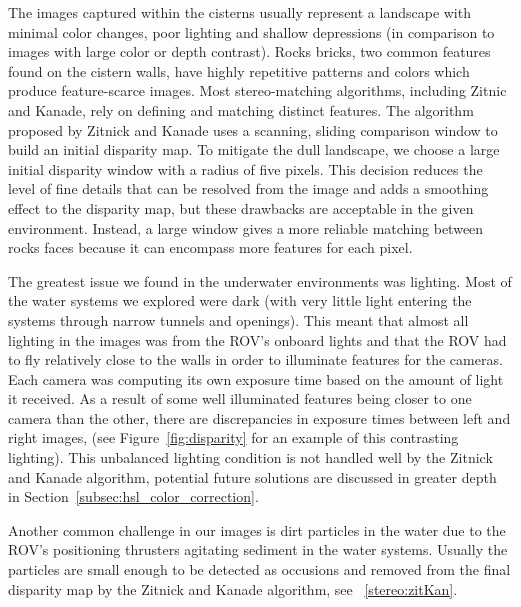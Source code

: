 \documentclass[twocolumn]{article}
\begin{document}
The images captured within the cisterns usually represent a landscape with minimal color changes, poor lighting and shallow depressions (in comparison to images with large color or depth contrast).
Rocks bricks, two common features found on the cistern walls, have highly repetitive patterns and colors which produce feature-scarce images.
Most stereo-matching algorithms, including Zitnic and Kanade, rely on defining and matching distinct features.
The algorithm proposed by Zitnick and Kanade uses a scanning, sliding comparison window to build an initial disparity map.
To mitigate the dull landscape, we choose a large initial disparity window with a radius of five pixels.
This decision reduces the level of fine details that can be resolved from the image and adds a smoothing effect to the disparity map, but these drawbacks are acceptable in the given environment.
Instead, a large window gives a more reliable matching between rocks faces because it can encompass more features for each pixel.  

The greatest issue we found in the underwater environments was lighting.  Most of the water systems we explored were dark (with very little light entering the systems through narrow tunnels and openings).  This meant that almost all lighting in the images was from the ROV's onboard lights and that the ROV had to fly relatively close to the walls in order to illuminate features for the cameras.
Each camera was computing its own exposure time based on the amount of light it received.  
As a result of some well illuminated features being closer to one camera than the other, there are discrepancies in exposure times between left and right images, (see Figure~\ref{fig:disparity} for an example of this contrasting lighting).
  This unbalanced lighting condition is not handled well by the Zitnick and Kanade algorithm, potential future solutions are discussed in greater depth in Section~\ref{subsec:hsl_color_correction}.

Another common challenge in our images is dirt particles in the water due to the ROV's positioning thrusters agitating sediment in the water systems. Usually the particles are small enough to be detected as occusions and removed from the final disparity map by the Zitnick and Kanade algorithm, see ~\ref{stereo:zitKan}.
\end{document}
